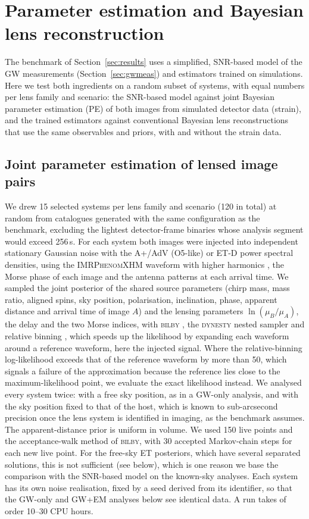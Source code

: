 \section{Parameter estimation and Bayesian lens reconstruction}
\label{sec:pe}
The benchmark of Section~\ref{sec:results} uses a simplified, SNR-based model of the GW measurements (Section~\ref{sec:gwmeas}) and estimators trained on simulations. Here we test both ingredients on a random subset of systems, with equal numbers per lens family and scenario: the SNR-based model against joint Bayesian parameter estimation (PE) of both images from simulated detector data (strain), and the trained estimators against conventional Bayesian lens reconstructions that use the same observables and priors, with and without the strain data.

\subsection{Joint parameter estimation of lensed image pairs}
\label{sec:jointpe}
We drew 15 selected systems per lens family and scenario (120 in total) at random from catalogues generated with the same configuration as the benchmark, excluding the lightest detector-frame binaries whose analysis segment would exceed 256\,s. For each system both images were injected into independent stationary Gaussian noise with the A+/AdV (O5-like) or ET-D power spectral densities, using the \textsc{IMRPhenomXHM} waveform with higher harmonics \citep{garciaquiros2020xhm}, the Morse phase of each image and the antenna patterns at each arrival time. We sampled the joint posterior of the shared source parameters (chirp mass, mass ratio, aligned spins, sky position, polarisation, inclination, phase, apparent distance and arrival time of image $A$) and the lensing parameters $\ln(\mu_B/\mu_A)$, the delay and the two Morse indices, with \textsc{bilby} \citep{ashton2019bilby}, the \textsc{dynesty} nested sampler \citep{speagle2020dynesty} and relative binning \citep{zackay2018relbin,krishna2023relbin}, which speeds up the likelihood by expanding each waveform around a reference waveform, here the injected signal. Where the relative-binning log-likelihood exceeds that of the reference waveform by more than 50, which signals a failure of the approximation because the reference lies close to the maximum-likelihood point, we evaluate the exact likelihood instead. We analysed every system twice: with a free sky position, as in a GW-only analysis, and with the sky position fixed to that of the host, which is known to sub-arcsecond precision once the lens system is identified in imaging, as the benchmark assumes. The apparent-distance prior is uniform in volume. We used 150 live points and the acceptance-walk method of \textsc{bilby}, with 30 accepted Markov-chain steps for each new live point. For the free-sky ET posteriors, which have several separated solutions, this is not sufficient (see below), which is one reason we base the comparison with the SNR-based model on the known-sky analyses. Each system has its own noise realisation, fixed by a seed derived from its identifier, so that the GW-only and GW+EM analyses below see identical data. A run takes of order 10--30 CPU hours.

